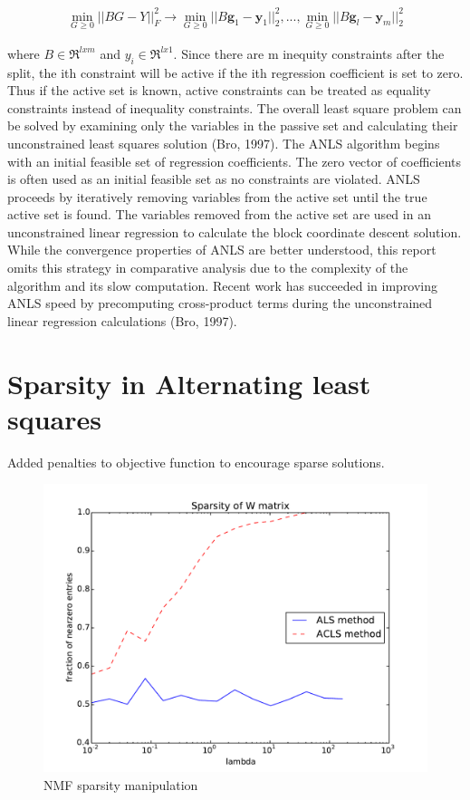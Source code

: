 \documentclass[final,leqno,onefignum,onetabnum]{siamltex1213}
\begin{document}
\begin{equation}
\begin{align} 
    \min_{G \ge 0} || BG-Y ||^{2}_{F} \to  \min_{G \ge 0} || B\textbf{g}_1-\textbf{y}_1 ||^{2}_{2}, ...,   \min_{G \ge 0} || B\textbf{g}_l-\textbf{y}_m ||^{2}_{2}
\end{align}
\end{equation}

where $ B \in \Re^{lxm}$ and $y_i \in \Re^{lx1}$. Since there are m inequity constraints after the split, the ith constraint will be active if the ith regression coefficient is set to zero. Thus if the active set is known, active constraints can be treated as equality constraints instead of inequality constraints. The overall least square problem can be solved by examining only the variables in the passive set and calculating their unconstrained least squares solution (Bro, 1997). The ANLS algorithm begins with an initial feasible set of regression coefficients. The zero vector of coefficients is often used as an initial feasible set as no constraints are violated. ANLS proceeds by iteratively removing variables from the active set until the true active set is found. The variables removed from the active set are used in an unconstrained linear regression to calculate the block coordinate descent solution. While the convergence properties of ANLS are better understood, this report omits this strategy in comparative analysis due to the complexity of the algorithm and its slow computation. Recent work has succeeded in improving ANLS speed by precomputing cross-product terms during the unconstrained linear regression calculations (Bro, 1997). 

\section{Sparsity in Alternating least squares}
Added penalties to objective function to encourage sparse solutions. 

\begin{figure}[h!]
  \caption{NMF sparsity manipulation}
  \centering
    \includegraphics{ALS_vs_ACLS_sparsity}
\end{figure}
\end{document}
